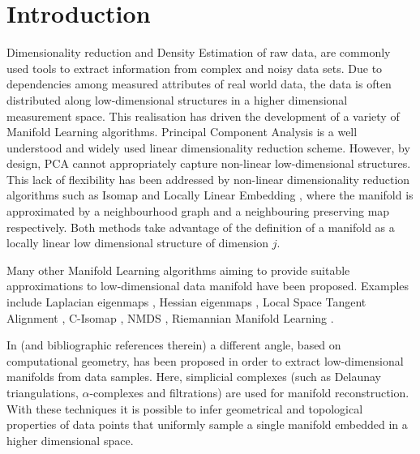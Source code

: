 \section{Introduction}


Dimensionality reduction and Density Estimation of raw data, are commonly used tools to extract information from complex and noisy data sets.
Due to dependencies among measured attributes of real world data,
the data is often distributed along low-dimensional structures in a higher dimensional measurement space.
This realisation has driven the development of a variety of Manifold Learning algorithms.
Principal Component Analysis \citep[PCA, ][]{Pearson1901} is a well understood and widely used linear dimensionality reduction scheme. 
However, by design, PCA cannot appropriately capture non-linear low-dimensional structures.
This lack of flexibility has been addressed by non-linear dimensionality reduction algorithms such as Isomap \cite{Tenenbaum2319}
and Locally Linear Embedding \citep[LLE][]{Roweis00nonlineardimensionality},
where the manifold is approximated by a neighbourhood graph and a neighbouring preserving map respectively.
Both methods take advantage of the definition of a manifold as a locally linear low dimensional structure of dimension $j$.

Many other Manifold Learning algorithms aiming to provide suitable approximations to low-dimensional data manifold have been proposed.
Examples include Laplacian eigenmaps \citep{Belkin01laplacianeigenmaps},
Hessian eigenmaps \citep{Donoho5591},
Local Space Tangent Alignment \citep[LSTA, ][]{Zhang02principalmanifolds},
C-Isomap \citep[an extension of Isomap to conformal embeddings][]{Silva:2002:GVL:2968618.2968708},
NMDS \citep[non-metric formulation of Multidimensional Scaling (MDS)][]{doi:10.1002/bs.3830040308, Cox2008, Kruskal1964},
Riemannian Manifold Learning \citep[RML, ][]{10.1109/TPAMI.2007.70735}.

In \cite{boissonnat:hal-01615863} (and bibliographic references therein) a different angle, based on computational geometry, 
has been proposed in order to extract low-dimensional manifolds from data samples.
Here, simplicial complexes (such as Delaunay triangulations, $\alpha$-complexes and filtrations)
are used for manifold reconstruction.
With these techniques it is possible to infer geometrical and topological properties of data points 
that uniformly sample a single manifold embedded in a higher dimensional space.

